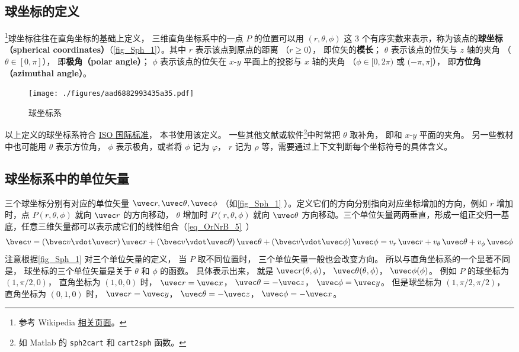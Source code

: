 

\subsection{球坐标的定义}

\footnote{参考 Wikipedia \href{https://en.wikipedia.org/wiki/Spherical_coordinate_system}{相关页面}。}球坐标往往在直角坐标的基础上定义， 三维直角坐标系中的一点 $P$ 的位置可以用 $(r,\theta ,\phi )$ 这 3 个有序实数来表示，称为该点的\textbf{球坐标（spherical coordinates）}（\autoref{fig_Sph_1}）。其中 $r$ 表示该点到原点的距离 （$r \geqslant 0$）， 即位矢的\textbf{模长}； $\theta$ 表示该点的位矢与 $z$ 轴的夹角 （$\theta  \in [0,\pi]$）， 即\textbf{极角（polar angle）}； $\phi$ 表示该点的位矢在 $x$-$y$ 平面上的投影与 $x$ 轴的夹角 （$\phi  \in [0,2\pi)$ 或 $(- \pi,\pi]$）， 即\textbf{方位角（azimuthal angle）}。

\begin{figure}[ht]
\centering
\texttt{[image: ./figures/aad6882993435a35.pdf]}
\caption{球坐标系}\label{fig_Sph_1}
\end{figure}

以上定义的球坐标系符合 \href{https://www.iso.org/standard/64973.html}{ISO 国际标准}， 本书使用该定义。 一些其他文献或软件\footnote{如 Matlab 的 \lstinline|sph2cart| 和 \lstinline|cart2sph| 函数。}中时常把 $\theta$ 取补角， 即和 $x$-$y$ 平面的夹角。 另一些教材中也可能用 $\theta $ 表示方位角， $\phi $ 表示极角，或者将 $\phi $ 记为 $\varphi $，  $r$ 记为 $\rho $ 等，需要通过上下文判断每个坐标符号的具体含义。

\subsection{球坐标系中的单位矢量}
三个球坐标分别有对应的单位矢量 $\uvec r, \uvec\theta, \uvec\phi$ （如\autoref{fig_Sph_1} ）。定义它们的方向分别指向对应坐标增加的方向，例如 $r$ 增加时，点 $P(r,\theta ,\phi )$ 就向 $\uvec r$ 的方向移动， $\theta$ 增加时 $P(r,\theta ,\phi )$ 就向 $\uvec \theta$ 方向移动。三个单位矢量两两垂直，形成一组正交归一基底，任意三维矢量都可以表示成它们的线性组合（\autoref{eq_OrNrB_5}~）
\begin{equation}\label{eq_Sph_1}
\bvec v = (\bvec v \vdot \uvec r)\,\uvec r + (\bvec v \vdot \uvec \theta)\,\uvec \theta  + (\bvec v \vdot \uvec \phi)\,\uvec \phi  = v_r \,\uvec r + v_\theta \,\uvec \theta  + v_\phi \,\uvec \phi 
\end{equation}
注意根据\autoref{fig_Sph_1} 对三个单位矢量的定义， 当 $P$ 取不同位置时， 三个单位矢量一般也会改变方向。 所以与直角坐标系的一个显著不同是， 球坐标的三个单位矢量是关于 $\theta$ 和 $\phi$ 的函数。 具体表示出来， 就是 $\uvec r(\theta ,\phi )$，  $\uvec \theta (\theta ,\phi )$，  $\uvec \phi (\phi )$。 
例如 $P$ 的球坐标为 $(1, \pi/2, 0)$， 直角坐标为 $(1, 0, 0)$ 时，
$\uvec r = \uvec x$， $\uvec \theta  =  - \uvec z$， $\uvec \phi  = \uvec y$。 
但是球坐标为 $(1, \pi/2, \pi/2)$， 直角坐标为 $(0, 1, 0)$ 时， $\uvec r = \uvec y$， $\uvec \theta  =  - \uvec z$， $\uvec \phi  =  - \uvec x$。

